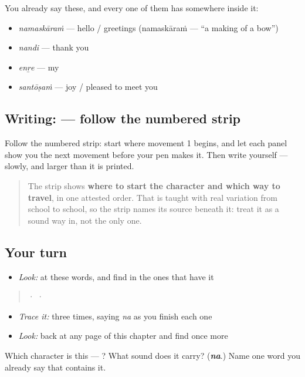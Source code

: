 You already say these, and every one of them has  somewhere inside it:

\begin{itemize}
\raggedright
  \item \textbf{} \emph{namaskāraṁ} — hello / greetings (namaskāraṁ — \textquotedblleft{}a making of a bow\textquotedblright{})
  \item \textbf{} \emph{nandi} — thank you
  \item \textbf{} \emph{enṟe} — my
  \item \textbf{} \emph{santōṣaṁ} — joy / pleased to meet you
\end{itemize}

\subsection*{Writing:  — follow the numbered strip}

Follow the numbered strip: start where movement 1 begins, and let each panel show you the next movement before your pen makes it. Then write  yourself — slowly, and larger than it is printed.

\begin{quote}
The strip shows \textbf{where to start the character and which way to travel}, in one attested order. That is taught with real variation from school to school, so the strip names its source beneath it: treat it as a sound way in, not the only one.
\end{quote}

\subsection*{Your turn}
\begin{itemize}
\raggedright
  \item \emph{Look:} at these words, and find  in the ones that have it
\end{itemize}

\begin{quote}
  ·    ·  
\end{quote}

\begin{itemize}
\raggedright
  \item \emph{Trace it:}  three times, saying \emph{na} as you finish each one
  \item \emph{Look:} back at any page of this chapter and find  once more
\end{itemize}

\begin{tcolorbox}[breakable,colback=teal!4,colframe=teal!35!black,title={Before you move on}]
Which character is this — ? What sound does it carry? (\emph{\textbf{na}}.) Name one word you already say that contains it.
\end{tcolorbox}
